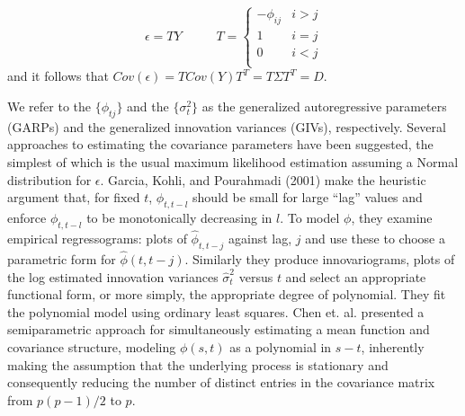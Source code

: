 \[
\epsilon = TY\;\;\;\;\;\;\;\;\;\; T= \left\{ \begin{array}{cr}
-\phi_{ij} & i > j \\
1 & i = j \\
0 & i < j \\
\end{array} \right.
\]
and it follows that  $Cov\left(\epsilon\right)  = T Cov\left( Y \right) T^T = T \Sigma T^T = D$.

We refer to the $\lbrace \phi_{tj} \rbrace$ and the $\lbrace \sigma_t^2 \rbrace$ as the generalized autoregressive parameters (GARPs) and the generalized innovation variances (GIVs), respectively. Several approaches to estimating the covariance parameters have been suggested, the simplest of which is the usual maximum likelihood estimation assuming a Normal distribution for $\epsilon$. Garcia, Kohli, and Pourahmadi (2001) make the heuristic argument that, for fixed $t$, $\phi_{t,t-l}$ should be small for large ``lag'' values and enforce $\phi_{t,t-l}$ to be monotonically decreasing in $l$. To model $\phi$, they examine empirical regressograms: plots of $\hat{\phi}_{t,t-j}$ against lag, $j$ and use these to choose a parametric form for $\hat{\phi}\left(t,t-j\right)$. Similarly they produce innovariograms, plots of the log estimated innovation variances $\hat{\sigma}_t^2$ versus $t$ and select an appropriate functional form, or more simply, the appropriate degree of polynomial. They fit the polynomial model using ordinary least squares. Chen et. al. presented a semiparametric approach for simultaneously estimating a mean function and covariance structure, modeling $\phi\left(s,t\right)$ as a polynomial in $s-t$, inherently making the assumption that the underlying process is stationary and consequently reducing the number of distinct entries in the covariance matrix from $p\left(p-1\right)/2$ to $p$. 

